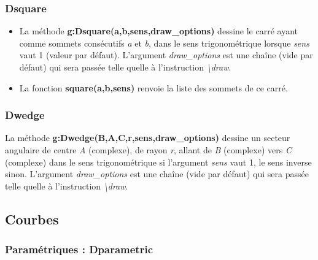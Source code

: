 \documentclass[%
10pt,%
a4paper,%
french,%
]%
{article}%
\begin{document}
\subsubsection{Dsquare}
\begin{itemize}
    \item La méthode \textbf{g:Dsquare(a,b,sens,draw\_options)} dessine le carré ayant comme sommets consécutifs \emph{a} et \emph{b}, dans le sens trigonométrique lorsque \emph{sens} vaut 1 (valeur par défaut). L'argument \emph{draw\_options} est une chaîne (vide par défaut) qui sera passée telle quelle à l'instruction \emph{\textbackslash draw}.
  \item La fonction \textbf{square(a,b,sens)} renvoie la liste des sommets de ce carré.
\end{itemize}

\subsubsection{Dwedge}
La méthode \textbf{g:Dwedge(B,A,C,r,sens,draw\_options)} dessine un secteur angulaire de centre \emph{A} (complexe), de rayon \emph{r}, allant de \emph{B} (complexe) vers \emph{C} (complexe) dans le sens trigonométrique si l'argument \emph{sens} vaut 1, le sens inverse sinon. L'argument \emph{draw\_options} est une chaîne (vide par défaut) qui sera passée telle quelle à l'instruction \emph{\textbackslash draw}.


\subsection{Courbes}

\subsubsection{Paramétriques : Dparametric}
\end{document}

